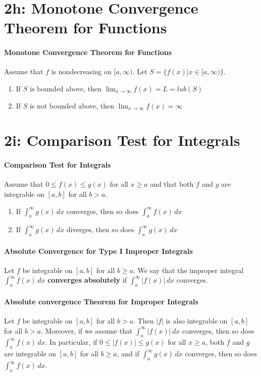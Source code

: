 \documentclass[10pt,letter]{article}
\begin{document}
\section*{2h: Monotone Convergence Theorem for Functions}
\paragraph{Monotone Convergence Theorem for Functions}
Assume that $f$ is nondecreasing on $[a,\infty)$. Let $S=\{f(x)|x\in[a,\infty)\}$. \begin{enumerate}
    \item If $S$ is bounded above, then $\lim_{x\rightarrow\infty}f(x)=L=lub(S)$
    \item If $S$ is not bounded above, then $\lim_{x\rightarrow\infty}f(x)=\infty$
\end{enumerate}

\section*{2i: Comparison Test for Integrals}
\paragraph{Comparison Test for Integrals}
Assume that $0\leq f(x)\leq g(x)$ for all $x\geq a$ and that both $f$ and $g$ are integrable on $[a,b]$ for all $b>a$. \begin{enumerate}
    \item If $\int_a^\infty g(x)\,dx$ converges, then so does $\int_a^\infty f(x)\,dx$ 
    \item If $\int_a^\infty g(x)\,dx$ diverges, then so does $\int_a^\infty g(x)\,dx$ 
\end{enumerate}

\paragraph{Absolute Convergence for Type I Improper Integrals}
Let $f$ be integrable on $[a,b]$ for all $b\geq a$. We say that the improper integral $\int_a^\infty f(x)\,dx$ \textbf{converges absolutely} if $\int_a^\infty |f(x)|\,dx$ converges.

\paragraph{Absolute convergence Theorem for Improper Integrals}
Let $f$ be integrable on $[a,b]$ for all $b>a$. Then $|f|$ is also integrable on $[a,b]$ for all $b>a$. Moreover, if we assume that $\int_a^\infty|f(x)|\,dx$ converges, then so does $\int_a^\infty f(x)\,dx$. In particular, if $0\leq|f(x)|\leq g(x)$ for all $x\geq a$, both $f$ and $g$ are integrable on $[a,b]$ for all $b\geq a$, and if $\int_a^\infty g(x)\,dx$ converges, then so does $\int_a^\infty f(x)\,dx$. 
\end{document}
